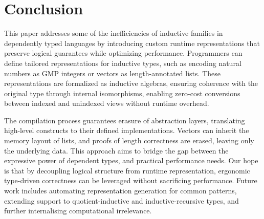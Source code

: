 \section{Conclusion}

This paper addresses some of the inefficiencies of inductive families in
dependently typed languages by introducing custom runtime representations that
preserve logical guarantees while optimizing performance. Programmers can define
tailored representations for inductive types, such as encoding natural numbers
as GMP integers or vectors as length-annotated lists. These representations are
formalized as inductive algebras, ensuring coherence with the original type
through internal isomorphisms, enabling zero-cost conversions between indexed
and unindexed views without runtime overhead.

The compilation process guarantees erasure of abstraction layers, translating
high-level constructs to their defined implementations. Vectors can inherit the
memory layout of lists, and proofs of length correctness are erased, leaving
only the underlying data. This approach aims to bridge the gap between the
expressive power of dependent types, and practical performance needs. Our hope
is that by decoupling logical structure from runtime representation, ergonomic
type-driven correctness can be leveraged without sacrificing performance. Future
work includes automating representation generation for common patterns,
extending support to quotient-inductive and inductive-recursive types, and
further internalising computational irrelevance.
